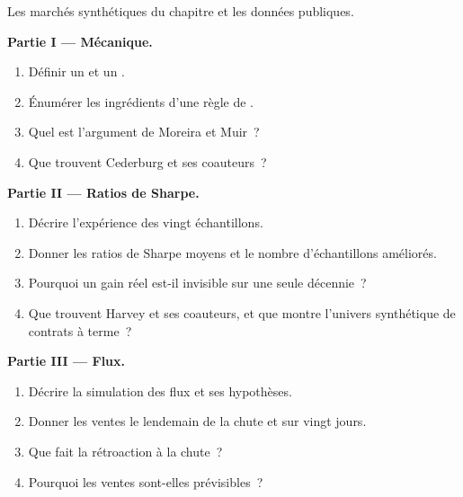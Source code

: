 \begin{problem}\label{pb:s1:volatility-targeting-and-risk-managed-portfolios:1}
Les marchés synthétiques du chapitre et les données publiques.

\medskip\noindent\textbf{Partie I --- Mécanique.}
\begin{enumerate}
\item Définir un  et un .
\item Énumérer les ingrédients d'une règle de .
\item Quel est l'argument de Moreira et Muir~?
\item Que trouvent Cederburg et ses coauteurs~?
\end{enumerate}

\medskip\noindent\textbf{Partie II --- Ratios de Sharpe.}
\begin{enumerate}[resume]
\item Décrire l'expérience des vingt échantillons.
\item Donner les ratios de Sharpe moyens et le nombre d'échantillons améliorés.
\item Pourquoi un gain réel est-il invisible sur une seule décennie~?
\item Que trouvent Harvey et ses coauteurs, et que montre l'univers synthétique de contrats à terme~?
\end{enumerate}

\medskip\noindent\textbf{Partie III --- Flux.}
\begin{enumerate}[resume]
\item Décrire la simulation des flux et ses hypothèses.
\item Donner les ventes le lendemain de la chute et sur vingt jours.
\item Que fait la rétroaction à la chute~?
\item Pourquoi les ventes sont-elles prévisibles~?
\end{enumerate}


\end{problem}
